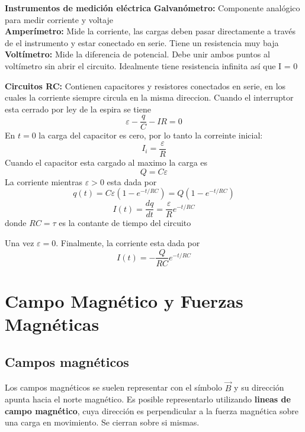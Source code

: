 \documentclass[a4paper, 10pt]{article}
\begin{document}
\begin{multicols*}{2}
	\textbf{Instrumentos de medición eléctrica}
	\textbf{Galvanómetro:} Componente analógico para medir corriente y voltaje\\
	\textbf{Amperímetro:} Mide la corriente, las cargas deben pasar directamente a través de el instrumento y estar  conectado en serie. Tiene un resistencia muy baja\\
	\textbf{Voltímetro:} Mide la diferencia de potencial. Debe unir ambos puntos al voltímetro sin abrir el circuito. Idealmente tiene resistencia infinita así que I = 0 
	    
	\textbf{Circuitos RC: }Contienen capacitores y resistores conectados en serie, en los cuales la corriente siempre circula en la misma direccion.
	Cuando el interruptor esta cerrado por ley de la espira se tiene
	$$\varepsilon -\frac{q}{C}-IR=0$$
	En $t=0$ la carga del capacitor es cero, por lo tanto la correinte inicial:
	$$I_i=\frac{\varepsilon}{R}$$
	Cuando el capacitor esta cargado al maximo la carga es
	$$Q=C\varepsilon$$
	La corriente mientras $\varepsilon > 0$ esta dada por
	$$q(t)=C\varepsilon(1-e^{-t/RC})=Q(1-e^{-t/RC})$$
	$$I(t) = \frac{dq}{dt} = \frac{\varepsilon}{R}e^{-t/RC}$$
	donde $RC=\tau$ es la contante de tiempo del circuito
	    
	Una vez $\varepsilon = 0$.
	Finalmente, la corriente esta dada por
	$$I(t) = -\frac{Q}{RC}e^{-t/RC}$$
	    
	\section{Campo Magnético y Fuerzas Magnéticas}
	\subsection*{Campos magnéticos}
	Los campos magnéticos se suelen representar con el símbolo $\vec{B}$ y su dirección apunta hacia el norte magnético. Es posible representarlo utilizando \textbf{lineas de campo magnético}, cuya dirección es perpendicular a la fuerza magnética sobre una carga en movimiento. Se cierran sobre si mismas.\\
	     

\end{multicols*}
\end{document}
